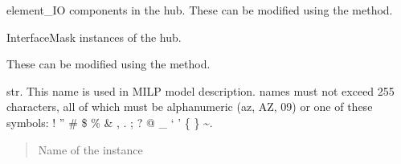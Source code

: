 \documentclass[letterpaper,10pt,english]{sphinxmanual}
\begin{document}
\begin{fulllineitems}
\begin{fulllineitems}
\label{\detokenize{generated/tamos.Hub:tamos.Hub.element_IOs}}
\pysigstartsignatures
{}
\pysigstopsignatures
\sphinxAtStartPar
element\_IO components in the hub.
These can be modified using the  method.

\end{fulllineitems}


\begin{fulllineitems}
\label{\detokenize{generated/tamos.Hub:tamos.Hub.interface_masks}}
\pysigstartsignatures
{}
\pysigstopsignatures
\sphinxAtStartPar
InterfaceMask instances of the hub.

\sphinxAtStartPar
These can be modified using the  method.

\end{fulllineitems}


\begin{fulllineitems}
\label{\detokenize{generated/tamos.Hub:tamos.Hub.name}}
\pysigstartsignatures
{}
\pysigstopsignatures
\sphinxAtStartPar
str.
This name is used in MILP model description.
names must not exceed 255 characters,
all of which must be alphanumeric (a\sphinxhyphen{}z, A\sphinxhyphen{}Z, 0\sphinxhyphen{}9) or one of these symbols:
! ” \# \$ \% \& , . ; ? @ \_ ‘ ’ \{ \} \textasciitilde{}.
\begin{quote}\begin{description}
\sphinxAtStartPar
Name of the instance

\end{description}\end{quote}

\end{fulllineitems}



\end{fulllineitems}
\end{document}
